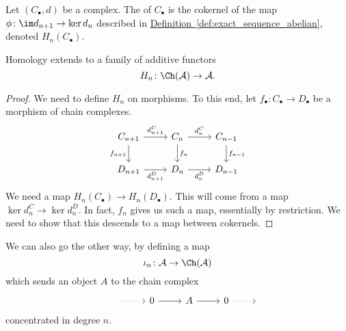 \documentclass[main.tex]{subfiles}
\begin{document}
\begin{definition}[homology]
  \label{def:homology}
  Let $(C_{\bullet}, d)$ be a complex. The  of $C_{\bullet}$ is the cokernel of the map $\phi\colon \im d_{n+1} \to \ker d_{n}$ described in \hyperref[def:exact_sequence_abelian]{Definition~\ref*{def:exact_sequence_abelian}}, denoted $H_{n}(C_{\bullet})$.
\end{definition}

\begin{proposition}
  Homology extends to a family of additive functors
  \begin{equation*}
    H_{n}\colon \Ch(\mathcal{A}) \to \mathcal{A}.
  \end{equation*}
\end{proposition}
\begin{proof}
  We need to define $H_{n}$ on morphisms. To this end, let $f_{\bullet}\colon C_{\bullet} \to D_{\bullet}$ be a morphism of chain complexes.
  \begin{equation*}
    \begin{tikzcd}
      C_{n+1}
      \arrow[r, "d^{C}_{n+1}"]
      \arrow[d, swap, "f_{n+1}"]
      & C_{n}
      \arrow[r, "d^{C}_{n}"]
      \arrow[d, "f_{n}"]
      & C_{n-1}
      \arrow[d, "f_{n-1}"]
      \\
      D_{n+1}
      \arrow[r, swap, "d^{D}_{n+1}"]
      & D_{n}
      \arrow[r, swap, "d^{D}_{n}"]
      & D_{n-1}
    \end{tikzcd}
  \end{equation*}
  We need a map $H_{n}(C_{\bullet}) \to H_{n}(D_{\bullet})$. This will come from a map $\ker d^{C}_{n} \to \ker d^{D}_{n}$. In fact, $f_{n}$ gives us such a map, essentially by restriction. We need to show that this descends to a map between cokernels.
\end{proof}

We can also go the other way, by defining a map
\begin{equation*}
  \iota_{n}\colon \mathcal{A} \to \Ch(\mathcal{A})
\end{equation*}
which sends an object $A$ to the chain complex
\begin{equation*}
  \begin{tikzcd}
    &{\ }
    \arrow[r, dotted]
    & 0
    \arrow[r]
    & A
    \arrow[r]
    & 0
    \arrow[r, dotted]
    &{\ }
  \end{tikzcd}
\end{equation*}
concentrated in degree $n$.
\end{document}
